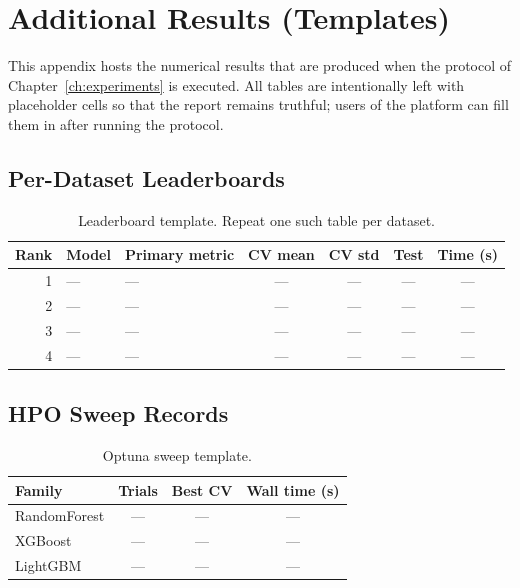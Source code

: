 \chapter{Additional Results (Templates)}
\label{app:extra}

This appendix hosts the numerical results that are produced when the
protocol of Chapter~\ref{ch:experiments} is executed. All tables are
intentionally left with placeholder cells so that the report remains
truthful; users of the platform can fill them in after running the
protocol.

\section{Per-Dataset Leaderboards}
\label{sec:per-dataset}

\begin{table}[H]
\centering
\caption{Leaderboard template. Repeat one such table per dataset.}
\label{tab:per-lb}
\small
\begin{tabularx}{\linewidth}{@{}rlXcccc@{}}
\toprule
\textbf{Rank} & \textbf{Model} & \textbf{Primary metric} & \textbf{CV mean} & \textbf{CV std} & \textbf{Test} & \textbf{Time (s)} \\
\midrule
1 & --- & --- & --- & --- & --- & --- \\
2 & --- & --- & --- & --- & --- & --- \\
3 & --- & --- & --- & --- & --- & --- \\
4 & --- & --- & --- & --- & --- & --- \\
\bottomrule
\end{tabularx}
\end{table}

\section{HPO Sweep Records}
\label{sec:hpo-records}

\begin{table}[H]
\centering
\caption{Optuna sweep template.}
\label{tab:hpo}
\begin{tabular}{@{}lccc@{}}
\toprule
\textbf{Family} & \textbf{Trials} & \textbf{Best CV} & \textbf{Wall time (s)} \\
\midrule
RandomForest & --- & --- & --- \\
XGBoost      & --- & --- & --- \\
LightGBM     & --- & --- & --- \\
\bottomrule
\end{tabular}
\end{table}

